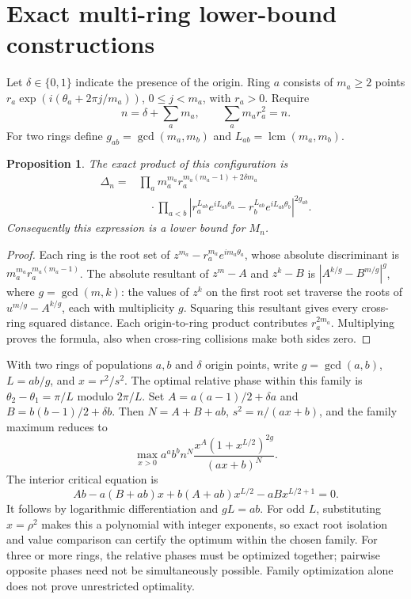 \documentclass[11pt]{article}
\newtheorem{proposition}[theorem]{Proposition}
\theoremstyle{remark}
\numberwithin{equation}{section}
\begin{document}
\section{Exact multi-ring lower-bound constructions}
Let $\delta\in\{0,1\}$ indicate the presence of the origin.
Ring $a$ consists of $m_a\ge2$ points
$r_a\exp(i(\theta_a+2\pi j/m_a))$, $0\le j<m_a$, with $r_a>0$.
Require
\[
 n=\delta+\sum_a m_a,\qquad \sum_a m_ar_a^2=n.
\]
For two rings define $g_{ab}=\gcd(m_a,m_b)$ and
$L_{ab}=\operatorname{lcm}(m_a,m_b)$.

\begin{proposition}\label{prop:rings}
The exact product of this configuration is
\begin{equation}\label{eq:rings}
\begin{split}
 \Delta_n={}&\prod_a m_a^{m_a}
       r_a^{m_a(m_a-1)+2\delta m_a}\\
 &\quad\cdot\prod_{a<b}
 \left|r_a^{L_{ab}}e^{iL_{ab}\theta_a}
       -r_b^{L_{ab}}e^{iL_{ab}\theta_b}\right|^{2g_{ab}}.
\end{split}
\end{equation}
Consequently this expression is a lower bound for $M_n$.
\end{proposition}
\begin{proof}
Each ring is the root set of
$z^{m_a}-r_a^{m_a}e^{im_a\theta_a}$, whose absolute discriminant
is $m_a^{m_a}r_a^{m_a(m_a-1)}$.
The absolute resultant of $z^m-A$ and $z^k-B$ is
$|A^{k/g}-B^{m/g}|^g$, where $g=\gcd(m,k)$:
the values of $z^k$ on the first root set traverse the roots of
$u^{m/g}-A^{k/g}$, each with multiplicity $g$.
Squaring this resultant gives every cross-ring squared distance.
Each origin-to-ring product contributes $r_a^{2m_a}$.
Multiplying proves the formula, also when cross-ring collisions make
both sides zero.
\end{proof}

With two rings of populations $a,b$ and $\delta$ origin points,
write $g=\gcd(a,b)$, $L=ab/g$, and $x=r^2/s^2$.
The optimal relative phase within this family is
$\theta_2-\theta_1=\pi/L$ modulo $2\pi/L$.
Set
$A=a(a-1)/2+\delta a$ and $B=b(b-1)/2+\delta b$.
Then $N=A+B+ab$, $s^2=n/(ax+b)$, and the family maximum reduces to
\begin{equation}\label{eq:two-rings}
 \max_{x>0} a^ab^bn^N
       \frac{x^A(1+x^{L/2})^{2g}}{(ax+b)^N}.
\end{equation}
The interior critical equation is
\begin{equation}\label{eq:ring-critical}
 Ab-a(B+ab)x+b(A+ab)x^{L/2}-aBx^{L/2+1}=0.
\end{equation}
It follows by logarithmic differentiation and
$gL=ab$. For odd $L$, substituting $x=\rho^2$ makes this a polynomial
with integer exponents, so exact root isolation and value comparison
can certify the optimum within the chosen family.
For three or more rings, the relative phases must be optimized together;
pairwise opposite phases need not be simultaneously possible.
Family optimization alone does not prove unrestricted optimality.
\end{document}
